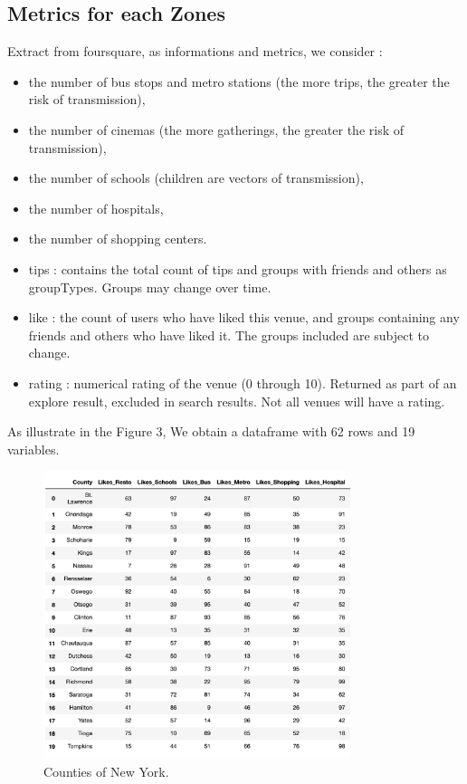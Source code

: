 \documentclass{article}
\begin{document}
\subsection{Metrics for each Zones}
Extract from foursquare,  as informations and metrics,  we consider : 
\begin{itemize}
\item the number of bus stops and metro stations (the more trips, the greater the risk of transmission),
\item the number of cinemas (the more gatherings, the greater the risk of transmission),
\item the number of schools (children are vectors of transmission),
\item the number of hospitals,
\item the number of shopping centers.
\item tips : contains the total count of tips and groups with friends and others as groupTypes. Groups may change over time.
\item like : the count of users who have liked this venue, and groups containing any friends and others who have liked it. The groups included are subject to change.
\item rating : numerical rating of the venue (0 through 10). Returned as part of an explore result, excluded in search results. Not all venues will have a rating.\\
\end{itemize}

As illustrate in the Figure 3,  We obtain a dataframe  with 62 rows and 19 variables.
\begin{figure}[h]
 \centering
\includegraphics[width=0.8\textwidth]{metric.png}
  \caption{Counties of New York.}
\end{figure}
\end{document}
